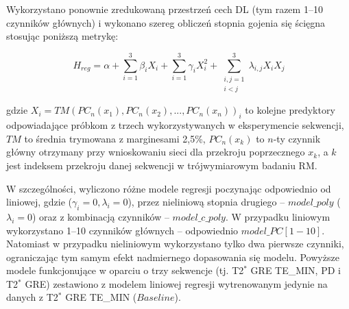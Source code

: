 Wykorzystano ponownie zredukowaną przestrzeń cech DL (tym razem 1--10 czynników głównych) i wykonano szereg obliczeń stopnia gojenia się ścięgna stosując poniższą metrykę: 

\begin{equation}
H_{reg} = \alpha + \sum_{i=1}^{3}\beta_{i}X_{i} + \sum_{i=1}^{3}\gamma_{i}X_{i}^{2} +
\sum_{\substack{i, j = 1\\ i < j}}^{3}\lambda_{i,j}X_{i}X_{j}
\end{equation}

gdzie $X_i = TM(PC_n(x_1), PC_n(x_2),..., PC_n(x_n))_{i}$ to kolejne predyktory odpowiadające próbkom z trzech wykorzystywanych w eksperymencie sekwencji, $TM$ \linebreak to średnia trymowana z marginesami 2,5\%, $PC_n(x_k)$ to $n$-ty czynnik główny otrzymany przy wnioskowaniu sieci dla przekroju poprzecznego $x_k$, a $k$ jest indeksem przekroju danej sekwencji w trójwymiarowym badaniu RM.

W szczególności, wyliczono różne modele regresji poczynając odpowiednio od liniowej, gdzie ($\gamma_{i}=0, \lambda_{i}=0$), przez nieliniową stopnia drugiego -- $model\_poly$ ($\lambda_{i}=0$) oraz z kombinacją czynników -- $model\_c\_poly$. W przypadku liniowym wykorzystano 1--10 czynników głównych -- odpowiednio $model\_PC[1-10]$. Natomiast w przypadku nieliniowym wykorzystano tylko dwa pierwsze czynniki, ograniczając tym samym efekt nadmiernego dopasowania się modelu. Powyższe modele funkcjonujące w oparciu o trzy sekwencje (tj. T2$^\ast$ GRE TE\_MIN, PD i T2$^\ast$ GRE) zestawiono z modelem liniowej regresji wytrenowanym jedynie na danych z T2$^\ast$ GRE TE\_MIN ($Baseline$). 

